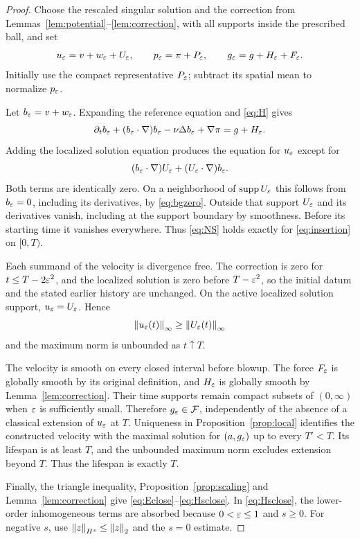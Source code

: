\begin{proof}
Choose the rescaled singular solution and the correction from Lemmas~\ref{lem:potential}--\ref{lem:correction}, with all supports inside the prescribed ball, and set
\begin{equation}\label{eq:insertion}
 u_\varepsilon=v+w_\varepsilon+U_\varepsilon,\qquad
 p_\varepsilon=\pi+P_\varepsilon,\qquad
 g_\varepsilon=g+H_\varepsilon+F_\varepsilon.
\end{equation}
Initially use the compact representative $P_\varepsilon$; subtract its spatial mean to normalize $p_\varepsilon$.

Let $b_\varepsilon=v+w_\varepsilon$. Expanding the reference equation and \eqref{eq:H} gives
\[
 \partial_tb_\varepsilon+(b_\varepsilon\cdot\nabla)b_\varepsilon
 -\nu\Delta b_\varepsilon+\nabla\pi=g+H_\varepsilon.
\]
Adding the localized solution equation produces the equation for $u_\varepsilon$ except for
\[
 (b_\varepsilon\cdot\nabla)U_\varepsilon+(U_\varepsilon\cdot\nabla)b_\varepsilon.
\]
Both terms are identically zero. On a neighborhood of $\operatorname{supp} U_\varepsilon$ this follows from $b_\varepsilon=0$, including its derivatives, by \eqref{eq:bgzero}. Outside that support $U_\varepsilon$ and its derivatives vanish, including at the support boundary by smoothness. Before its starting time it vanishes everywhere. Thus \eqref{eq:NS} holds exactly for \eqref{eq:insertion} on $[0,T)$.

Each summand of the velocity is divergence free. The correction is zero for
$t\le T-2\varepsilon^2$, and the localized solution is zero before $T-\varepsilon^2$, so the initial datum and the stated earlier history are unchanged. On the active localized solution support, $u_\varepsilon=U_\varepsilon$. Hence
\[
 \left\lVert u_\varepsilon(t)\right\rVert_\infty\ge\left\lVert U_\varepsilon(t)\right\rVert_\infty
\]
and the maximum norm is unbounded as $t\uparrow T$.

The velocity is smooth on every closed interval before blowup. The force $F_\varepsilon$ is globally smooth by its original definition, and $H_\varepsilon$ is globally smooth by Lemma~\ref{lem:correction}. Their time supports remain compact subsets of $(0,\infty)$ when $\varepsilon$ is sufficiently small. Therefore $g_\varepsilon\in\mathcal F$, independently of the absence of a classical extension of $u_\varepsilon$ at $T$. Uniqueness in Proposition~\ref{prop:local} identifies the constructed velocity with the maximal solution for $(a,g_\varepsilon)$ up to every $T'<T$. Its lifespan is at least $T$, and the unbounded maximum norm excludes extension beyond $T$. Thus the lifespan is exactly $T$.

Finally, the triangle inequality, Proposition~\ref{prop:scaling} and
Lemma~\ref{lem:correction} give \eqref{eq:Eclose}--\eqref{eq:Hsclose}. In
\eqref{eq:Hsclose}, the lower-order inhomogeneous terms are absorbed because
$0<\varepsilon\le1$ and $s\ge0$. For negative $s$, use
$\left\lVert z\right\rVert_{H^s}\le\left\lVert z\right\rVert_2$ and the $s=0$ estimate.
\end{proof}

